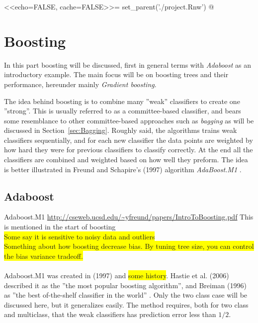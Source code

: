 <<echo=FALSE, cache=FALSE>>=
set_parent('./project.Rnw')
@
\section{Boosting}
\label{sec:Boosting}
In this part boosting will be discussed, first in general terms with \textit{Adaboost} as an introductory example. The main focus will be on boosting trees and their performance, hereunder mainly \textit{Gradient boosting}.

The idea behind boosting is to combine many ''weak'' classifiers to create one ''strong''. This is usually referred to as a committee-based classifier, and bears some resemblance to other committee-based approaches such as \textit{bagging} as will be discussed in Section~\ref{sec:Bagging}.  Roughly said, the algorithms trains weak classifiers sequentially, and for each new classifier the data points are weighted by how hard they were for previous classifiers to classify correctly. At the end all the classifiers are combined and weighted based on how well they preform. The idea is better illustrated in Freund and Schapire's (1997) algorithm \textit{AdaBoost.M1} \cite{adaboostM1}.
\subsection{Adaboost}
\label{sub:Adaboost}
Adaboost.M1 \url{http://cseweb.ucsd.edu/~yfreund/papers/IntroToBoosting.pdf} This is mentioned in the start of boosting \cite{modstat} \\
\colorbox{yellow}{Some say it is sensitive to noisy data and outliers}\\
\colorbox{yellow}{Something about how boosting decrease bias. By tuning tree size, you can control the bias variance tradeoff.}\\
\\
Adaboost.M1 was created in (1997) and \colorbox{yellow}{some history}. Hastie et al. (2006) \cite{modstat} described it as the ''the most popular boosting algorithm'', and Breiman (1996) \cite{Breiman1996} as ''the best of-the-shelf classifier in the world'' . Only the two class case will be discussed here, but it generalizes easily. The method requires, both for two class and multiclass, that the weak classifiers has prediction error less than $1/2$.

